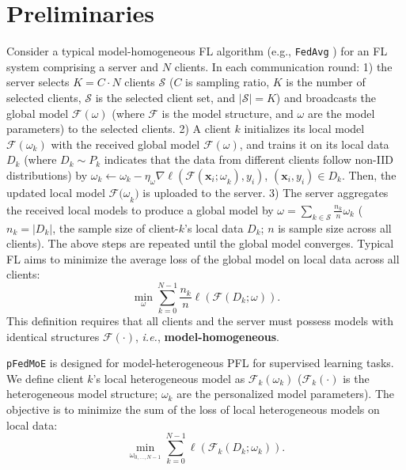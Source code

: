 \documentclass[sigconf]{acmart}
\newcommand{\hetero}{heterogeneous }
\newcommand{\homo}{homogeneous }
\newcommand{\pers}{personalized }
\newcommand{\methodname}{{\tt{pFedMoE}}}
\begin{document}
\section{Preliminaries}
Consider a typical model-\homo FL algorithm (e.g., {\tt{FedAvg}} \citep{FedAvg}) for an FL system comprising a server and $N$ clients. In each communication round: 1) the server selects $K=C\cdot N$ clients $\boldsymbol{\mathcal{S}}$ ($C$ is sampling ratio, $K$ is the number of selected clients, $\boldsymbol{\mathcal{S}}$ is the selected client set, and $|\boldsymbol{\mathcal{S}}|=K$) and broadcasts the global model $\mathcal{F}(\omega)$ (where $\mathcal{F}$ is the model structure, and $\omega$ are the model parameters) to the selected clients. 2) A client $k$ initializes its local model $\mathcal{F}(\omega_k)$ with the received global model $\mathcal{F}(\omega)$, and trains it on its local data $D_k$ (where $D_k \sim P_k$ indicates that the data from different clients follow non-IID distributions) by $\omega_k\gets\omega_k-\eta_\omega\nabla\ell(\mathcal{F}({\boldsymbol{x}_i;\omega}_k),y_i)$, $(\boldsymbol{x}_i,y_i)\in D_k$. Then, the updated local model ${\mathcal{F}(\omega}_k)$ is uploaded to the server. 3) The server aggregates the received local models to produce a global model by $\omega=\sum_{k\in\boldsymbol{\mathcal{S}}}\frac{n_k}{n}\omega_k$ ($n_k=|D_k|$, the sample size of client-$k$'s local data $D_k$; $n$ is sample size across all clients). The above steps are repeated until the global model converges. Typical FL aims to minimize the average loss of the global model on local data across all clients:
\begin{equation}
\min _\omega \sum_{k=0}^{N-1} \frac{n_k}{n} \ell(\mathcal{F}(D_k ; \omega)).
\end{equation}
This definition requires that all clients and the server must possess models with identical structures $\mathcal{F}(\cdot )$, \emph{i.e.}, \textbf{model-homogeneous}.


\methodname{} is designed for model-heterogeneous PFL for supervised learning tasks. We define client $k$'s local \hetero model as $\mathcal{F}_k(\omega_k)$ ($\mathcal{F}_k(\cdot)$ is the heterogeneous model structure; $\omega_k$ are the \pers model parameters). The objective is to minimize the sum of the loss of local \hetero models on local data:
\begin{equation}\label{eq:FedMoE1}
\min _{\omega_{0, \ldots, N-1}} \sum_{k=0}^{N-1} \ell(\mathcal{F}_k(D_k ; \omega_k)).
\end{equation}
\end{document}
